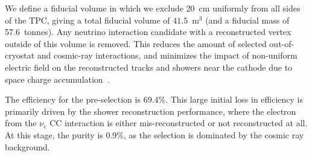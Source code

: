 
We define a fiducial volume in which we exclude 20~cm uniformly from all sides of the TPC, giving a total fiducial volume of $41.5$~m$^3$ (and a fiducial mass of 57.6~tonnes). Any neutrino interaction candidate with a reconstructed vertex outside of this volume is removed. This reduces the amount of selected out-of-cryostat and cosmic-ray interactions, and minimizes the impact of non-uniform electric field on the reconstructed tracks and showers near the cathode due to space charge accumulation~\cite{Abratenko_2020}.


The efficiency for the pre-selection is 69.4\%. This large initial loss in efficiency is primarily driven by the shower reconstruction performance, where the electron from the $\nu_e$ CC interaction is either mis-reconstructed or not reconstructed at all. 
At this stage, the purity is 0.9\%, as the selection is dominated by the cosmic ray background.

